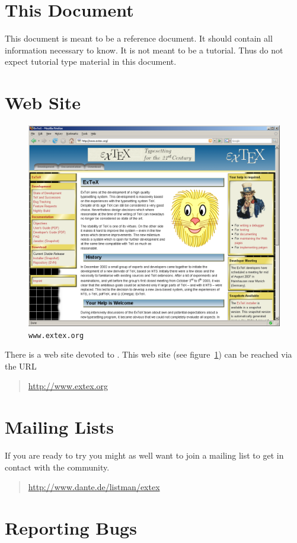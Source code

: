 \section{This Document}

This document is meant to be a reference document. It should contain
all information necessary to know. It is not meant to be a tutorial.
Thus do not expect tutorial type material in this document.


\section{Web Site}%

\begin{figure}[!ht]
  \centering
  \includegraphics[width=.5\textwidth]{img/www-extex-org}
  \caption{\texttt{www.extex.org}}
  \label{fig:www.exetex.org}
\end{figure}
There is a web site devoted to \ExTeX. This
web site (see figure~\ref{fig:www.exetex.org}) can be reached via the
URL
\begin{quotation}
  \url{http://www.extex.org}
\end{quotation}


\section{Mailing Lists}

If you are ready to try \ExBib{} you might as well want to join a
mailing list to get in contact with the community.

\begin{quotation}
  \url{http://www.dante.de/listman/extex}
\end{quotation}


\section{Reporting Bugs}


